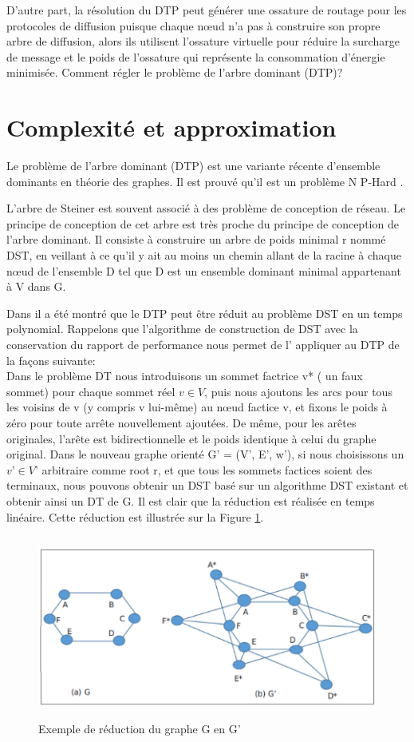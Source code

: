 D’autre part, la résolution du DTP peut générer une ossature de routage pour les protocoles de diffusion puisque chaque nœud n’a pas à construire son propre arbre de diffusion, alors ils utilisent l'ossature virtuelle pour réduire la surcharge de message et le poids de l'ossature qui représente la consommation d'énergie minimisée. Comment régler le problème de l’arbre dominant (DTP)? 


\section{Complexité et approximation}
Le problème de l’arbre dominant (DTP) est une variante récente d’ensemble dominants en théorie des graphes. Il est prouvé qu'il est un problème N P-Hard \cite{shin2010approximation,zhang2008new}.

L’arbre de Steiner est souvent associé à des problème de conception de réseau. Le principe de conception de cet arbre est très proche du principe de conception de l’arbre dominant. Il consiste à construire un arbre de poids minimal r nommé DST, en veillant à ce qu'il y ait au moins un chemin allant de la racine à chaque nœud de l'ensemble D tel que D est un ensemble dominant minimal appartenant à V dans G.

Dans \cite{shin2010approximation} il a été montré que le DTP peut être réduit au problème DST en un temps polynomial. Rappelons que l’algorithme de construction de DST avec la conservation du rapport de performance nous permet de l’ appliquer au DTP de la façons suivante:\\
Dans le problème DT nous introduisons un sommet factrice v* ( un faux sommet) pour chaque sommet réel $v \in V$,  puis nous ajoutons les arcs pour tous les voisins de v (y compris v lui-même) au nœud factice v, et fixons le poids à zéro pour toute arrête nouvellement ajoutées. De même, pour les arêtes originales, l’arête est bidirectionnelle et le poids identique à celui du graphe original. Dans le nouveau graphe orienté G’ = (V’, E’, w’), si nous choisissons un $v’ \in V’$ arbitraire comme root r, et que tous les sommets factices soient des terminaux, nous pouvons obtenir un DST basé sur un algorithme DST existant \cite{zhang2008new} et obtenir ainsi un DT de G. Il est clair que la réduction est réalisée en temps linéaire. Cette réduction est illustrée sur la Figure \ref{fig:31}.

\begin{figure}[H]
	\centering
	\includegraphics[width=15cm,height=6cm]{Chap3/1.png}
	\caption{Exemple de réduction du graphe G en G’}
	\label{fig:31}
\end{figure}

